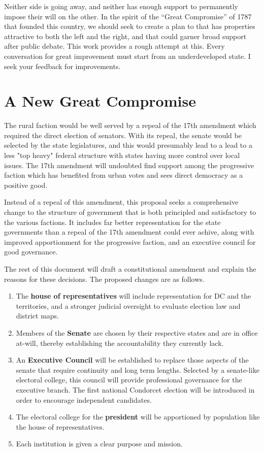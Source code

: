 \documentclass{article}
\begin{document}
Neither side is going away, and neither has enough support to permanently impose their will on the other. In the spirit of the “Great Compromise” of 1787 that founded this country, we should seek to create a plan to that has properties attractive to both the left and the right, and that could garner broad support after public debate. This work provides a rough attempt at this. Every conversation for great improvement must start from an underdeveloped state. I seek your feedback for improvements.

\section{A New Great Compromise}

The rural faction would be well served by a repeal of the 17th amendment\cite{Tucker}\cite{Virginia} which required the direct election of senators. With its repeal, the senate would be selected by the state legislatures, and this would presumably lead to a lead to a less "top heavy" federal structure with states having more control over local issues. The 17th amendment will undoubted find support among the progressive faction which has benefited from urban votes and sees direct democracy as a positive good\cite{Smith}.

Instead of a repeal of this amendment, this proposal seeks a comprehensive change to the structure of government that is both principled and satisfactory to the various factions. It includes far better representation for the state governments than a repeal of the 17th amendment could ever achive, along with improved apportionment for the progressive faction, and an executive council for good governance.

The rest of this document will draft a constitutional amendment and explain the reasons for these decisions. The proposed changes are as follows.
\begin{enumerate}
  \item The \textbf{house of representatives} will include representation for DC and the territories, and a stronger judicial oversight to evaluate election law and district maps.
  \item Members of the \textbf{Senate} are chosen by their respective states and are in office at-will, thereby establishing the accountability they currently lack.
  \item An \textbf{Executive Council} will be established to replace those aspects of the senate that require continuity and long term lengths. Selected by a senate-like electoral college, this council will provide professional governance for the executive branch. The first national Condorcet election will be introduced in order to encourage independent candidates.
  \item The electoral college for the \textbf{president} will be apportioned by population like the house of representatives.
 \item Each institution is given a clear purpose and mission.
\end{enumerate}
\end{document}
